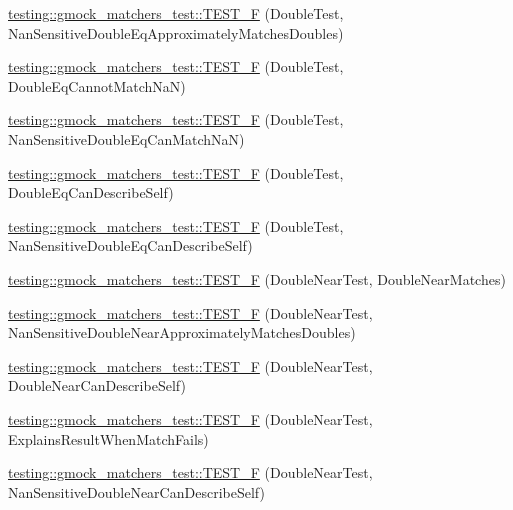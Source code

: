 \begin{DoxyCompactItemize}
\hyperlink{namespacetesting_1_1gmock__matchers__test_ab100ee4a4b0340e31212fb43c9e28255}{testing\+::gmock\+\_\+matchers\+\_\+test\+::\+T\+E\+S\+T\+\_\+F} (Double\+Test, Nan\+Sensitive\+Double\+Eq\+Approximately\+Matches\+Doubles)
\item 
\hyperlink{namespacetesting_1_1gmock__matchers__test_a4c34f3f339de72d3f4f96a08a5125b59}{testing\+::gmock\+\_\+matchers\+\_\+test\+::\+T\+E\+S\+T\+\_\+F} (Double\+Test, Double\+Eq\+Cannot\+Match\+NaN)
\item 
\hyperlink{namespacetesting_1_1gmock__matchers__test_ab42c199ae0008ce7550f584742caec28}{testing\+::gmock\+\_\+matchers\+\_\+test\+::\+T\+E\+S\+T\+\_\+F} (Double\+Test, Nan\+Sensitive\+Double\+Eq\+Can\+Match\+NaN)
\item 
\hyperlink{namespacetesting_1_1gmock__matchers__test_a5975fb5a50e5364fe21422093680a559}{testing\+::gmock\+\_\+matchers\+\_\+test\+::\+T\+E\+S\+T\+\_\+F} (Double\+Test, Double\+Eq\+Can\+Describe\+Self)
\item 
\hyperlink{namespacetesting_1_1gmock__matchers__test_a2d101d1823617f9b1346ee64cdce5216}{testing\+::gmock\+\_\+matchers\+\_\+test\+::\+T\+E\+S\+T\+\_\+F} (Double\+Test, Nan\+Sensitive\+Double\+Eq\+Can\+Describe\+Self)
\item 
\hyperlink{namespacetesting_1_1gmock__matchers__test_ab2949593472038919b8f3e1b2da204bc}{testing\+::gmock\+\_\+matchers\+\_\+test\+::\+T\+E\+S\+T\+\_\+F} (Double\+Near\+Test, Double\+Near\+Matches)
\item 
\hyperlink{namespacetesting_1_1gmock__matchers__test_add8765ad2bb98f4b064ee77b4c21a612}{testing\+::gmock\+\_\+matchers\+\_\+test\+::\+T\+E\+S\+T\+\_\+F} (Double\+Near\+Test, Nan\+Sensitive\+Double\+Near\+Approximately\+Matches\+Doubles)
\item 
\hyperlink{namespacetesting_1_1gmock__matchers__test_a31d14a68cacbaab3fafd26247cc11f9c}{testing\+::gmock\+\_\+matchers\+\_\+test\+::\+T\+E\+S\+T\+\_\+F} (Double\+Near\+Test, Double\+Near\+Can\+Describe\+Self)
\item 
\hyperlink{namespacetesting_1_1gmock__matchers__test_a4250d3de38128f3452a0a9e93173bdb4}{testing\+::gmock\+\_\+matchers\+\_\+test\+::\+T\+E\+S\+T\+\_\+F} (Double\+Near\+Test, Explains\+Result\+When\+Match\+Fails)
\item 
\hyperlink{namespacetesting_1_1gmock__matchers__test_ad147bef4b26c0a060cb4d25fe517a3e3}{testing\+::gmock\+\_\+matchers\+\_\+test\+::\+T\+E\+S\+T\+\_\+F} (Double\+Near\+Test, Nan\+Sensitive\+Double\+Near\+Can\+Describe\+Self)
\item 

\end{DoxyCompactItemize}
